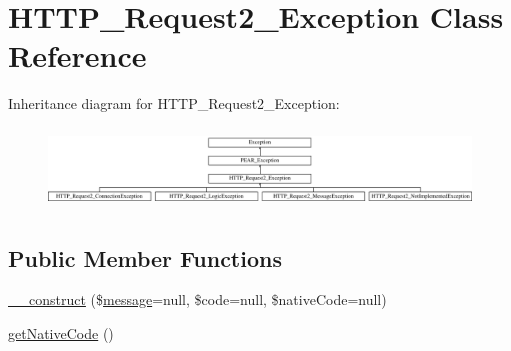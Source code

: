 \hypertarget{classHTTP__Request2__Exception}{}\section{H\+T\+T\+P\+\_\+\+Request2\+\_\+\+Exception Class Reference}
\label{classHTTP__Request2__Exception}
Inheritance diagram for H\+T\+T\+P\+\_\+\+Request2\+\_\+\+Exception\+:\begin{figure}[H]
\begin{center}
\leavevmode
\includegraphics[height=2.162162cm]{classHTTP__Request2__Exception}
\end{center}
\end{figure}
\subsection*{Public Member Functions}
\begin{DoxyCompactItemize}
\item 
\hyperlink{classHTTP__Request2__Exception_a47da8c63916bdd299dc2c23b03f01bed}{\+\_\+\+\_\+construct} (\$\hyperlink{classmessage}{message}=null, \$code=null, \$native\+Code=null)
\item 
\hyperlink{classHTTP__Request2__Exception_a9d09eee1bf0232f394fd9f842c939d45}{get\+Native\+Code} ()
\end{DoxyCompactItemize}
